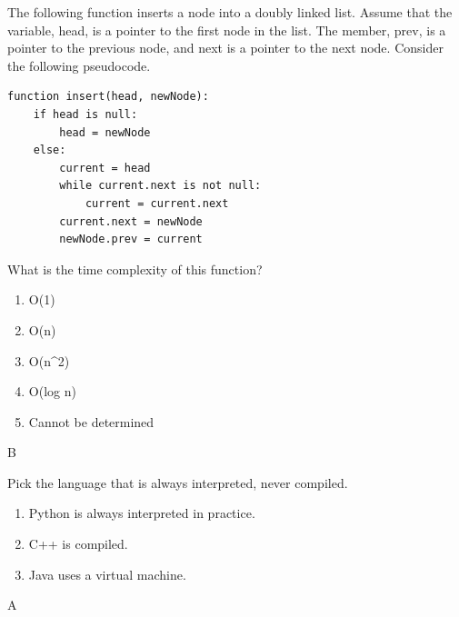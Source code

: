 \item The following function inserts a node into a doubly linked list. Assume that the variable, head, is a pointer to the first node in the list. The member, prev, is a pointer to the previous node, and next is a pointer to the next node. Consider the following pseudocode.

\begin{lstlisting}
function insert(head, newNode):
    if head is null:
        head = newNode
    else:
        current = head
        while current.next is not null:
            current = current.next
        current.next = newNode
        newNode.prev = current
\end{lstlisting}

What is the time complexity of this function?
\begin{enumerate}[label=\Alph*.]
\item O(1)
\item O(n)
\item O(n^2)
\item O(log n)
\item Cannot be determined
\end{enumerate}

\begin{solution}
    B
\end{solution}


\item Pick the language that is always interpreted, never compiled.
\begin{enumerate}[label=\Alph*.]
\item Python is always interpreted in practice.
\item C++ is compiled.
\item Java uses a virtual machine.
\end{enumerate}

\begin{solution}
    A
\end{solution}

